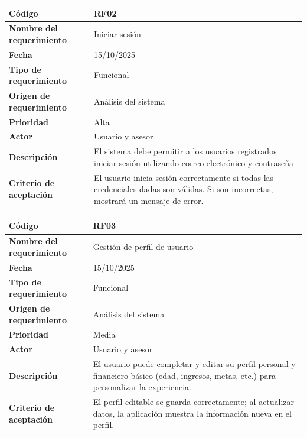 \begin{table}[H]
	\begin{tabular}{|a{5cm}|m{11cm}|}
		\hline
		\textbf{Código} & RF02 \\ \hline
		\textbf{Nombre del requerimiento} & Iniciar sesión \\ \hline
		\textbf{Fecha} & 15/10/2025 \\ \hline
		\textbf{Tipo de requerimiento} & Funcional \\ \hline
		\textbf{Origen de requerimiento} & Análisis del sistema \\ \hline
		\textbf{Prioridad} & Alta \\ \hline
		\textbf{Actor} & Usuario y asesor \\ \hline
		\textbf{Descripción} & El sistema debe permitir a los usuarios registrados iniciar sesión utilizando correo electrónico y contraseña \\ \hline
		\textbf{Criterio de aceptación} & El usuario inicia sesión correctamente si todas las credenciales dadas son válidas. Si son incorrectas, mostrará un mensaje de error. \\ \hline
	\end{tabular}
\end{table}

\begin{table}[H]
	\begin{tabular}{|a{5cm}|m{11cm}|}
		\hline
		\textbf{Código} & RF03 \\ \hline
		\textbf{Nombre del requerimiento} & Gestión de perfil de usuario \\ \hline
		\textbf{Fecha} & 15/10/2025 \\ \hline
		\textbf{Tipo de requerimiento} & Funcional \\ \hline
		\textbf{Origen de requerimiento} & Análisis del sistema \\ \hline
		\textbf{Prioridad} & Media \\ \hline
		\textbf{Actor} & Usuario y asesor \\ \hline
		\textbf{Descripción} & El usuario puede completar y editar su perfil personal y financiero básico (edad, ingresos, metas, etc.) para personalizar la experiencia. \\ \hline
		\textbf{Criterio de aceptación} & El perfil editable se guarda correctamente; al actualizar datos, la aplicación muestra la información nueva en el perfil. \\ \hline
	\end{tabular}
\end{table}

